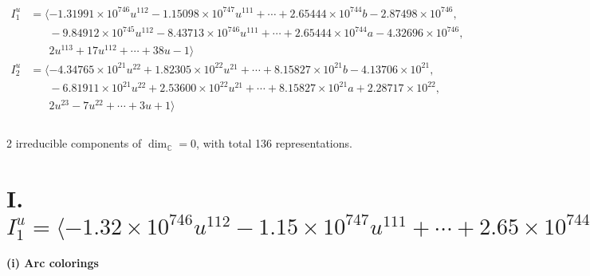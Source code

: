\documentclass[1p]{elsarticle_modified}
\theoremstyle{definition}
\begin{document}
\begin{align*}
I^u_{1}&=\langle 
-1.31991\times10^{746} u^{112}-1.15098\times10^{747} u^{111}+\cdots+2.65444\times10^{744} b-2.87498\times10^{746},\\
\phantom{I^u_{1}}&\phantom{= \langle  }-9.84912\times10^{745} u^{112}-8.43713\times10^{746} u^{111}+\cdots+2.65444\times10^{744} a-4.32696\times10^{746},\\
\phantom{I^u_{1}}&\phantom{= \langle  }2 u^{113}+17 u^{112}+\cdots+38 u-1\rangle \\
I^u_{2}&=\langle 
-4.34765\times10^{21} u^{22}+1.82305\times10^{22} u^{21}+\cdots+8.15827\times10^{21} b-4.13706\times10^{21},\\
\phantom{I^u_{2}}&\phantom{= \langle  }-6.81911\times10^{21} u^{22}+2.53600\times10^{22} u^{21}+\cdots+8.15827\times10^{21} a+2.28717\times10^{22},\\
\phantom{I^u_{2}}&\phantom{= \langle  }2 u^{23}-7 u^{22}+\cdots+3 u+1\rangle \\
\\
\end{align*}
\raggedright * 2 irreducible components of $\dim_{\mathbb{C}}=0$, with total 136 representations.\\
\newpage
\renewcommand{\arraystretch}{1}
\centering \section*{I. $I^u_{1}= \langle -1.32\times10^{746} u^{112}-1.15\times10^{747} u^{111}+\cdots+2.65\times10^{744} b-2.87\times10^{746},\;-9.85\times10^{745} u^{112}-8.44\times10^{746} u^{111}+\cdots+2.65\times10^{744} a-4.33\times10^{746},\;2 u^{113}+17 u^{112}+\cdots+38 u-1 \rangle$}
\flushleft \textbf{(i) Arc colorings}\\
\end{document}
